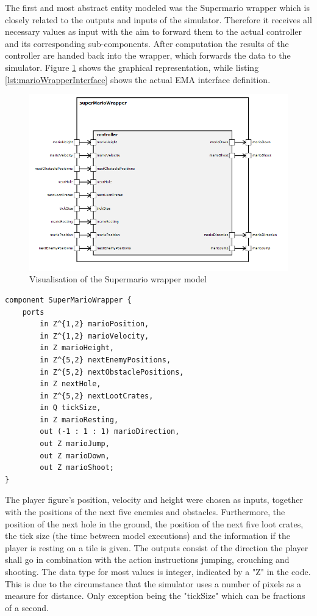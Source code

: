 The first and most abstract entity modeled was the Supermario wrapper which is closely related to the outputs and inputs of the simulator. Therefore it receives all necessary values as input with the aim to forward them to the actual controller and its corresponding sub-components. After computation the results of the controller are handed back into the wrapper, which forwards the data to the simulator. Figure \ref{fig:marioWrapper} shows the graphical representation, while listing \ref{lst:marioWrapperInterface} shows the actual EMA interface definition.
\begin{figure}
	\centering
	\includegraphics[width=\textwidth]{pictures/haller_supermariowrapper.PNG}
	\caption{Visualisation of the Supermario wrapper model}
	\label{fig:marioWrapper}
\end{figure}

\begin{lstlisting}[float,label=lst:marioWrapperInterface, caption=Interface of the Supermario Wrapper, language=EMAM]
component SuperMarioWrapper {
    ports   
        in Z^{1,2} marioPosition,
        in Z^{1,2} marioVelocity,
        in Z marioHeight,
        in Z^{5,2} nextEnemyPositions,
        in Z^{5,2} nextObstaclePositions,
        in Z nextHole,
        in Z^{5,2} nextLootCrates,
        in Q tickSize,
        in Z marioResting,
        out (-1 : 1 : 1) marioDirection,
        out Z marioJump,
        out Z marioDown,
        out Z marioShoot;
}
\end{lstlisting}

The player figure's position, velocity and height were chosen as inputs, together with the positions of the next five enemies and obstacles. Furthermore, the position of the next hole in the ground, the position of the next five loot crates, the tick size (the time between model executions) and the information if the player is resting on a tile is given.
The outputs consist of the direction the player shall go in combination with the action instructions jumping, crouching and shooting.
The data type for most values is integer, indicated by a "Z" in the code. This is due to the circumstance that the simulator uses a number of pixels as a measure for distance. Only exception being the "tickSize" which can be fractions of a second.

